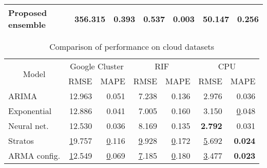 \begin{table}[]
\begin{tabular}{|l|l|r|r|r|r|r|}
Proposed ensemble                                     & \textbf{356.315}        & \textbf{0.393} & 0.537 & \textbf{0.003} &  50.147 & 0.256 \\ \hline
\end{tabular}
\end{table}

\begin{table}[]
\centering
\caption{Comparison of performance on cloud datasets}
\label{my-label}
\begin{tabular}{|l|r|r|r|r|r|r|}
\hline
\multicolumn{1}{|c|}{\multirow{2}{*}{Model}} & \multicolumn{2}{c|}{Google Cluster}                   & \multicolumn{2}{c|}{RIF}                              & \multicolumn{2}{c|}{CPU}                              \\ \cline{2-7} 
\multicolumn{1}{|c|}{}                       & \multicolumn{1}{c|}{RMSE} & \multicolumn{1}{c|}{MAPE} & \multicolumn{1}{c|}{RMSE} & \multicolumn{1}{c|}{MAPE} & \multicolumn{1}{c|}{RMSE} & \multicolumn{1}{c|}{MAPE} \\ \hline
ARIMA                                        & 12.963                    & 0.051                     & 7.238                     & 0.136                     & 2.976                     & 0.036                     \\ \hline
Exponential                                  & 12.886                    & 0.041                     & 7.005                     & 0.160                     & 3.150                     & {\ul 0.048}               \\ \hline
Neural net.                                  & 12.530                    & 0.036                     & 8.169                     & 0.135                     & \textbf{2.792}            & 0.031                     \\ \hline
Stratos                                      & {\ul 19.757}              & {\ul 0.116}               & {\ul 9.928}               & {\ul 0.172}               & {\ul 5.692}               & \textbf{0.024}            \\ \hline

ARMA config.                                      & {\ul 12.549}              & {\ul 0.069}               & {\ul 7.185}               & {\ul 0.180}               & {\ul 3.477}               & \textbf{0.023}            \\ \hline


\end{tabular}
\end{table}
